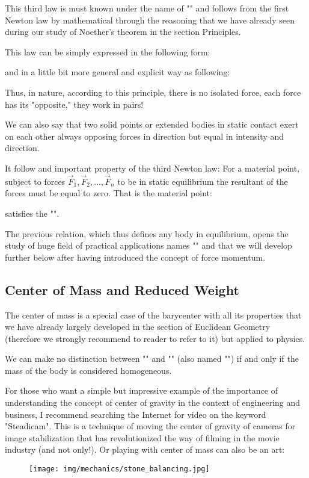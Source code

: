 	This third law is must known under the name of "" and follows from the first Newton law by mathematical through the reasoning that we have already seen during our study of Noether's theorem in the section Principles.
	
	This law can be simply expressed in the following form:
	
	and in a little bit more general and explicit way as following:
	
	Thus, in nature, according to this principle, there is no isolated force, each force has its "opposite," they work in pairs!
	
	We can also say that two solid points or extended bodies in static contact exert on each other always opposing forces in direction but equal in intensity and direction.
	
	It follow and important property of the third Newton law: For a material point, subject to forces $\vec{F}_1,\vec{F}_2,\ldots, \vec{F}_n$ to be in static equilibrium the resultant of the forces must be equal to zero. That is the material point:
	
	satisfies the "".
	
	The previous relation, which thus defines any body in equilibrium, opens the study of huge field of practical applications names "" and that we will develop further below after having introduced the concept of force momentum.
	
	\subsection{Center of Mass and Reduced Weight}
	The center of mass is a special case of the barycenter with all its properties that we have already largely developed in the section of Euclidean Geometry (therefore we strongly recommend to reader to refer to it) but applied to physics.
	
	We can make no distinction between "" and "" (also named "") if and only if the mass of the body is considered homogeneous.
	
	For those who want a simple but impressive example of the importance of understanding the concept of center of gravity in the context of engineering and business, I recommend searching the Internet for video on the keyword "Steadicam". This is a technique of moving the center of gravity of cameras for image stabilization that has revolutionized the way of filming in the movie industry (and not only!). Or playing with center of mass can also be an art:
	\begin{figure}[H]
		\centering
		\texttt{[image: img/mechanics/stone\_balancing.jpg]}
	\end{figure}
	
